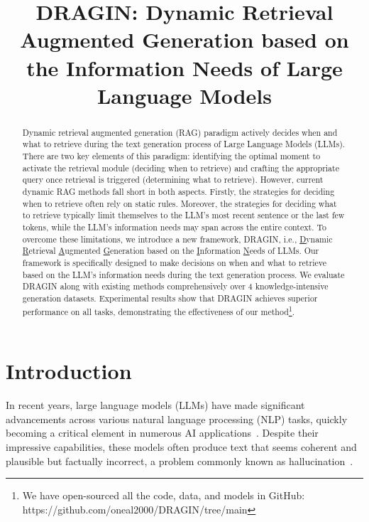 \title{DRAGIN: Dynamic Retrieval Augmented Generation based on the Information Needs of Large Language Models}



\maketitle

\begin{abstract}

Dynamic retrieval augmented generation (RAG) paradigm actively decides when and what to retrieve during the text generation process of Large Language Models (LLMs).
There are two key elements of this paradigm: identifying the optimal moment to activate the retrieval module (deciding when to retrieve) and crafting the appropriate query once retrieval is triggered (determining what to retrieve).
However, current dynamic RAG methods fall short in both aspects. 
Firstly, the strategies for deciding when to retrieve often rely on static rules. 
Moreover, the strategies for deciding what to retrieve typically limit themselves to the LLM's most recent sentence or the last few tokens, while the LLM's information needs may span across the entire context.
To overcome these limitations, we introduce a new framework, DRAGIN, i.e., \underline{D}ynamic \underline{R}etrieval \underline{A}ugmented \underline{G}eneration based on the \underline{I}nformation \underline{N}eeds of LLMs. 
Our framework is specifically designed to make decisions on when and what to retrieve based on the LLM's information needs during the text generation process.
We evaluate DRAGIN along with existing methods comprehensively over 4 knowledge-intensive generation datasets. Experimental results show that DRAGIN achieves superior performance on all tasks, demonstrating the effectiveness of our method\footnote{We have open-sourced all the code, data, and models in GitHub: https://github.com/oneal2000/DRAGIN/tree/main}. 

\end{abstract}

\section{Introduction}

In recent years, large language models (LLMs) have made significant advancements across various natural language processing (NLP) tasks, quickly becoming a critical element in numerous AI applications~\cite{brown2020language,chowdhery2022palm,touvron2023llama,scao2022bloom,zhang2022opt}. Despite their impressive capabilities, these models often produce text that seems coherent and plausible but factually incorrect, a problem commonly known as hallucination~\cite{maynez2020faithfulness,zhou2020detecting,liu2021token,ji2023survey,su2024unsupervised}.

